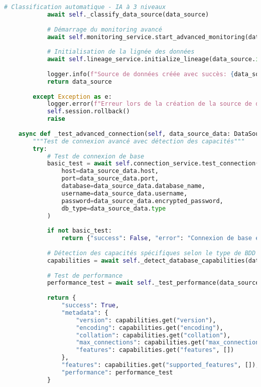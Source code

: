 \begin{lstlisting}[language=Python, caption=Service DataSourceService - Résolution des Limitations Microsoft Purview]
            # Classification automatique - IA à 3 niveaux
            await self._classify_data_source(data_source)
            
            # Démarrage du monitoring avancé
            await self.monitoring_service.start_advanced_monitoring(data_source.id)
            
            # Initialisation de la lignée des données
            await self.lineage_service.initialize_lineage(data_source.id)
            
            logger.info(f"Source de données créée avec succès: {data_source.name}")
            return data_source
            
        except Exception as e:
            logger.error(f"Erreur lors de la création de la source de données: {e}")
            self.session.rollback()
            raise
    
    async def _test_advanced_connection(self, data_source_data: DataSourceCreate) -> Dict[str, Any]:
        """Test de connexion avancé avec détection des capacités"""
        try:
            # Test de connexion de base
            basic_test = await self.connection_service.test_connection(
                host=data_source_data.host,
                port=data_source_data.port,
                database=data_source_data.database_name,
                username=data_source_data.username,
                password=data_source_data.encrypted_password,
                db_type=data_source_data.type
            )
            
            if not basic_test:
                return {"success": False, "error": "Connexion de base échouée"}
            
            # Détection des capacités spécifiques selon le type de BDD
            capabilities = await self._detect_database_capabilities(data_source_data)
            
            # Test de performance
            performance_test = await self._test_performance(data_source_data)
            
            return {
                "success": True,
                "metadata": {
                    "version": capabilities.get("version"),
                    "encoding": capabilities.get("encoding"),
                    "collation": capabilities.get("collation"),
                    "max_connections": capabilities.get("max_connections"),
                    "features": capabilities.get("features", [])
                },
                "features": capabilities.get("supported_features", []),
                "performance": performance_test
            }
            

\end{lstlisting}
